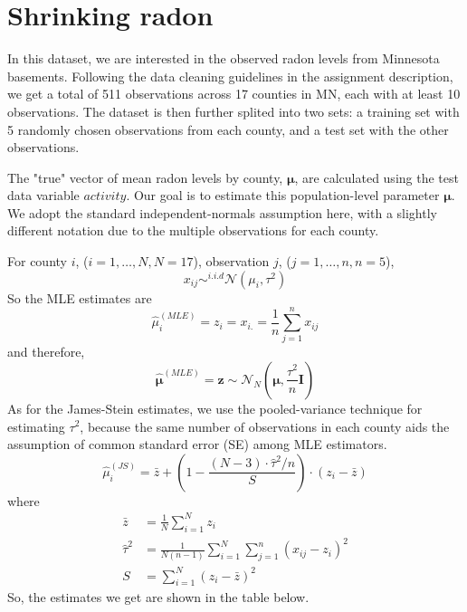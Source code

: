 \documentclass{article}\usepackage{graphicx, color}
\begin{document}
\newpage
\section*{Shrinking radon}
\hspace{12 pt} In this dataset, we are interested in the observed
radon levels from Minnesota basements. Following the data cleaning
guidelines in the assignment description, we get a total of
511 observations across 17 counties in MN, each with at least 10
observations.
The dataset is then further splited into two sets:
a training set with 5 randomly chosen observations from
each county, and a test set with the other observations.





The "true" vector of mean radon levels by county, $\bm{\mu}$, are calculated
using the test data variable $activity$. Our goal is to estimate this
population-level parameter $\bm{\mu}$.
We adopt the standard independent-normals assumption here, with a slightly
different notation due to the multiple observations for each county.





For county $i$, ($i=1,\dots,N, N=17$), observation $j$, ($j=1,\dots,n, n=5$),
\begin{displaymath}
x_{ij} \sim^{i.i.d} \mathcal{N}(\mu_i,\tau^2)
\end{displaymath}
So the MLE estimates are
\begin{displaymath}
\hat{\mu}_i^{(MLE)}= z_i = x_{i.} = \frac{1}{n} \sum_{j=1}^n x_{ij}
\end{displaymath}
and therefore,
\begin{displaymath}
\hat{\bm{\mu}}^{(MLE)}=\bm{z} \sim \mathcal{N}_N(\bm{\mu},\frac{\tau^2}{n}\bm{I})
\end{displaymath}
As for the James-Stein estimates, we use the pooled-variance technique for estimating
$\tau^2$, because the same number of observations in each county aids the 
assumption of common standard error (SE) among MLE estimators.
\begin{displaymath}
\hat{\mu}_i^{(JS)} = \bar{z} + (1-\frac{(N-3)\cdot \hat{\tau}^2/n}{S})\cdot(z_i - \bar{z})
\end{displaymath}
where
\begin{displaymath}
\begin{split}
\bar{z} &= \frac{1}{N} \sum_{i=1}^N z_i \\
\hat{\tau}^2 &= \frac{1}{N(n-1)} \sum_{i=1}^N \sum_{j=1}^n (x_{ij} - z_i)^2\\
S &= \sum_{i=1}^N (z_i - \bar{z})^2
\end{split}
\end{displaymath}
So, the estimates we get are shown in the table below.
\end{document}
